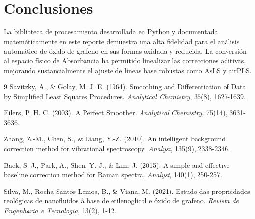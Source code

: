 \documentclass[a4paper,11pt]{article}
\begin{document}
\section{Conclusiones}
La biblioteca de procesamiento desarrollada en Python y documentada matemáticamente en este reporte demuestra una alta fidelidad para el análisis automático de óxido de grafeno en sus formas oxidada y reducida. La conversión al espacio físico de Absorbancia ha permitido linealizar las correcciones aditivas, mejorando sustancialmente el ajuste de líneas base robustas como AsLS y airPLS.

\begin{thebibliography}{9}
Savitzky, A., \& Golay, M. J. E. (1964). Smoothing and Differentiation of Data by Simplified Least Squares Procedures. \textit{Analytical Chemistry}, 36(8), 1627-1639.

Eilers, P. H. C. (2003). A Perfect Smoother. \textit{Analytical Chemistry}, 75(14), 3631-3636.

Zhang, Z.-M., Chen, S., \& Liang, Y.-Z. (2010). An intelligent background correction method for vibrational spectroscopy. \textit{Analyst}, 135(9), 2338-2346.

Baek, S.-J., Park, A., Shen, Y.-J., \& Lim, J. (2015). A simple and effective baseline correction method for Raman spectra. \textit{Analyst}, 140(1), 250-257.

Silva, M., Rocha Santos Lemos, B., \& Viana, M. (2021). Estudo das propriedades reológicas de nanofluidos à base de etilenoglicol e óxido de grafeno. \textit{Revista de Engenharia e Tecnologia}, 13(2), 1-12.
\end{thebibliography}
\end{document}

